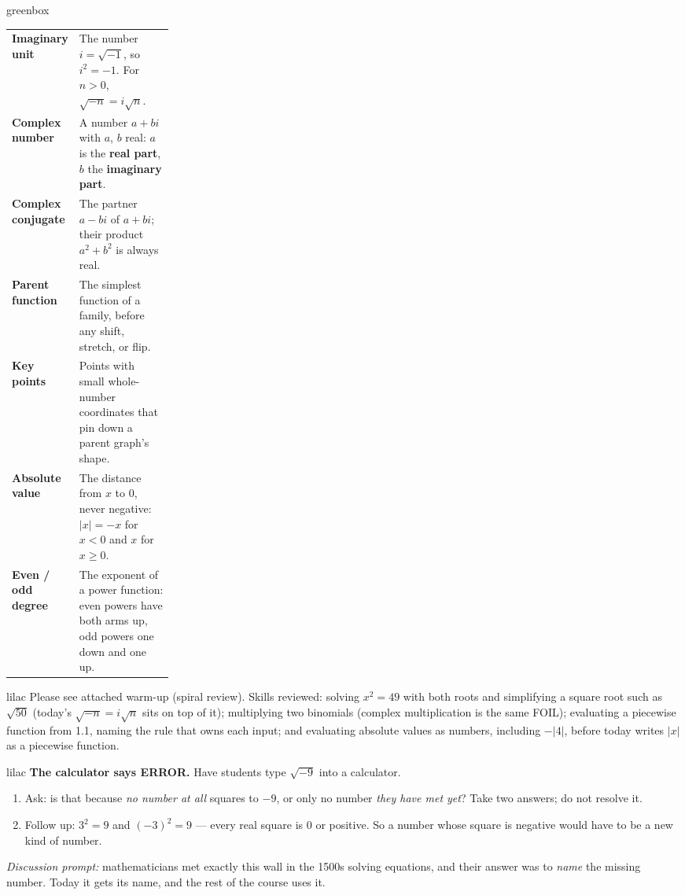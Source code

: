 \documentclass[10pt]{article}
\begin{document}
\begin{skillbox}{greenbox}
\renewcommand{\arraystretch}{1.4}
\begin{tabularx}{\linewidth}{@{} >{\leavevmode\bfseries\color{plum}}p{0.24\linewidth} X @{}}
Imaginary unit     & The number $i = \sqrt{-1}$, so $i^2 = -1$. For $n > 0$, $\sqrt{-n} = i\sqrt{n}$. \\
Complex number     & A number $a + bi$ with $a$, $b$ real: $a$ is the \textbf{real part}, $b$ the \textbf{imaginary part}. \\
Complex conjugate  & The partner $a - bi$ of $a + bi$; their product $a^2 + b^2$ is always real. \\
Parent function    & The simplest function of a family, before any shift, stretch, or flip. \\
Key points         & Points with small whole-number coordinates that pin down a parent graph's shape. \\
Absolute value     & The distance from $x$ to 0, never negative: $|x| = -x$ for $x < 0$ and $x$ for $x \ge 0$. \\
Even / odd degree  & The exponent of a power function: even powers have both arms up, odd powers one down and one up. \\
\end{tabularx}
\end{skillbox}

\begin{skillbox}{lilac}
    Please see attached warm-up (spiral review).
    Skills reviewed: solving $x^2 = 49$ with both roots and simplifying a square root such as
    $\sqrt{50}$ (today's $\sqrt{-n} = i\sqrt{n}$ sits on top of it); multiplying two binomials
    (complex multiplication is the same FOIL); evaluating a piecewise function from 1.1,
    naming the rule that owns each input; and evaluating absolute values as numbers, including
    $-|4|$, before today writes $|x|$ as a piecewise function.
\end{skillbox}

\begin{skillbox}{lilac}
    \textbf{The calculator says ERROR.} Have students type $\sqrt{-9}$ into a calculator.
    \begin{enumerate}[itemsep=2pt]
        \item Ask: is that because \textit{no number at all} squares to $-9$, or only no number
              \textit{they have met yet}? Take two answers; do not resolve it.
        \item Follow up: $3^2 = 9$ and $(-3)^2 = 9$ --- every real square is 0 or positive. So
              a number whose square is negative would have to be a new kind of number.
    \end{enumerate}
    \textit{Discussion prompt:} mathematicians met exactly this wall in the 1500s solving
    equations, and their answer was to \textit{name} the missing number. Today it gets its
    name, and the rest of the course uses it.
\end{skillbox}
\end{document}
